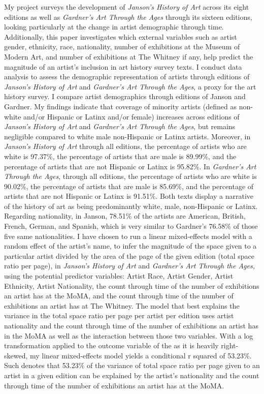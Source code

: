 \documentclass[
  letterpaper,
  DIV=11,
  numbers=noendperiod]{scrreprt}
\begin{document}
My project surveys the development of \emph{Janson's History of Art}
across its eight editions as well as \emph{Gardner's Art Through the
Ages} through its sixteen editions, looking particularly at the change
in artist demographic through time. Additionally, this paper
investigates which external variables such as artist gender, ethnicity,
race, nationality, number of exhibitions at the Museum of Modern Art,
and number of exhibitions at The Whitney if any, help predict the
magnitude of an artist's inclusion in art history survey texts. I
conduct data analysis to assess the demographic representation of
artists through editions of \emph{Janson's History of Art} and
\emph{Gardner's Art Through the Ages}, a proxy for the art history
survey. I compare artist demographics through editions of Janson and
Gardner. My findings indicate that coverage of minority artists (defined
as non-white and/or Hispanic or Latinx and/or female) increases across
editions of \emph{Janson's History of Art} and \emph{Gardner's Art
Through the Ages}, but remains negligible compared to white male
non-Hispanic or Latinx artists. Moreover, in \emph{Janson's History of
Art} through all editions, the percentage of artists who are white is
97.37\%, the percentage of artists that are male is 89.99\%, and the
percentage of artists that are not Hispanic or Latinx is 95.82\%. In
\emph{Gardner's Art Through the Ages}, through all editions, the
percentage of artists who are white is 90.02\%, the percentage of
artists that are male is 85.69\%, and the percentage of artists that are
not Hispanic or Latinx is 91.51\%. Both texts display a narrative of the
history of art as being predominantly white, male, non-Hispanic or
Latinx. Regarding nationality, in Janson, 78.51\% of the artists are
American, British, French, German, and Spanish, which is very similar to
Gardner's 76.58\% of those five same nationalities. I have chosen to run
a linear mixed-effects model with a random effect of the artist's name,
to infer the magnitude of the space given to a particular artist divided
by the area of the page of the given edition (total space ratio per
page), in \emph{Janson's History of Art} and \emph{Gardner's Art Through
the Ages,} using the potential predictor variables: Artist Race, Artist
Gender, Artist Ethnicity, Artist Nationality, the count through time of
the number of exhibitions an artist has at the MoMA, and the count
through time of the number of exhibitions an artist has at The Whitney.
The model that best explains the variance in the total space ratio per
page per artist per edition uses artist nationality and the count
through time of the number of exhibitions an artist has in the MoMA as
well as the interaction between those two variables. With a log
transformation applied to the outcome variable of the as it is heavily
right-skewed, my linear mixed-effects model yields a conditional r
squared of 53.23\%. Such denotes that 53.23\% of the variance of total
space ratio per page given to an artist in a given edition can be
explained by the artist's nationality and the count through time of the
number of exhibitions an artist has at the MoMA.
\end{document}
